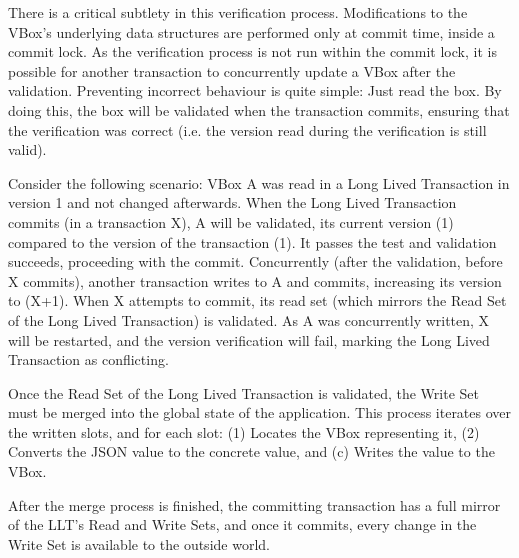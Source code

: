 There is a critical subtlety in this verification
process. Modifications to the VBox's underlying data structures are
performed only at commit time, inside a commit lock. As the
verification process is not run within the commit lock, it is possible
for another transaction to concurrently update a VBox after the
validation. Preventing incorrect behaviour is quite simple: Just read
the box. By doing this, the box will be validated when the transaction
commits, ensuring that the verification was correct (i.e. the version
read during the verification is still valid).

Consider the following scenario: VBox A was read in a Long Lived
Transaction in version 1 and not changed afterwards. When the Long
Lived Transaction commits (in a transaction X), A will be validated,
its current version (1) compared to the version of the transaction
(1). It passes the test and validation succeeds, proceeding with the
commit. Concurrently (after the validation, before X commits), another
transaction writes to A and commits, increasing its version to (X+1). When
X attempts to commit, its read set (which mirrors the Read Set of the
Long Lived Transaction) is validated. As A was concurrently written, X
will be restarted, and the version verification will fail, marking the
Long Lived Transaction as conflicting.

Once the Read Set of the Long Lived Transaction is validated, the
Write Set must be merged into the global state of the
application. This process iterates over the written slots, and for
each slot: (1) Locates the VBox representing it, (2) Converts the JSON
value to the concrete value, and (c) Writes the value to the VBox.

After the merge process is finished, the committing transaction has a
full mirror of the LLT's Read and Write Sets, and once it commits,
every change in the Write Set is available to the outside world.

